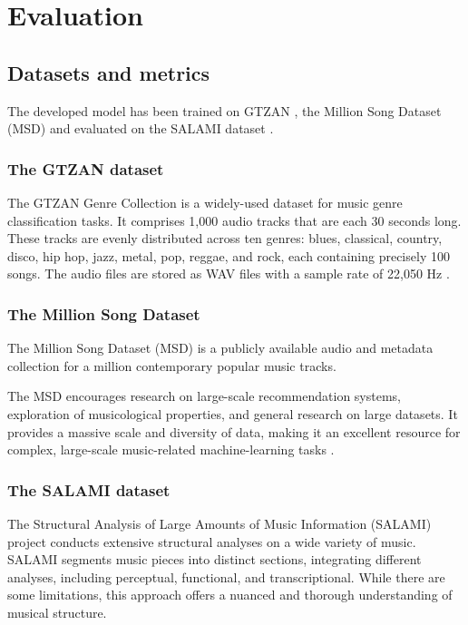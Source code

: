 \chapter{Evaluation}

\section{Datasets and metrics}
\label{section:Datasets and metrics}

The developed model has been trained on GTZAN \cite{GTZAN}, the Million Song Dataset (MSD) \cite{MSD} and evaluated on the SALAMI dataset \cite{Smith2011DESIGNANNOTATIONS}. 

\subsection{The GTZAN dataset}
The GTZAN Genre Collection is a widely-used dataset for music genre classification tasks. It comprises 1,000 audio tracks that are each 30 seconds long. These tracks are evenly distributed across ten genres: blues, classical, country, disco, hip hop, jazz, metal, pop, reggae, and rock, each containing precisely 100 songs. The audio files are stored as WAV files with a sample rate of 22,050 Hz \cite{GTZAN}.

\subsection{The Million Song Dataset}
The Million Song Dataset (MSD) is a publicly available audio and metadata collection for a million contemporary popular music tracks.

The MSD encourages research on large-scale recommendation systems, exploration of musicological properties, and general research on large datasets. It provides a massive scale and diversity of data, making it an excellent resource for complex, large-scale music-related machine-learning tasks \cite{MSD}.

\subsection{The SALAMI dataset}

The Structural Analysis of Large Amounts of Music Information (SALAMI) project conducts extensive structural analyses on a wide variety of music. SALAMI segments music pieces into distinct sections, integrating different analyses, including perceptual, functional, and transcriptional. While there are some limitations, this approach offers a nuanced and thorough understanding of musical structure.


